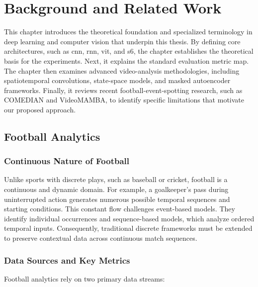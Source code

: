\chapter{Background and Related Work}
\label{chap:background}

This chapter introduces the theoretical foundation and specialized terminology in deep learning and computer vision that underpin this thesis. By defining core architectures, such as \acrfull{cnn}, \acrfull{rnn}, \acrfull{vit}, and \acrfull{s6}, the chapter establishes the theoretical basis for the experiments. Next, it explains the standard evaluation metric \acrfull{map}. The chapter then examines advanced video-analysis methodologies, including spatiotemporal convolutions, state-space models, and masked autoencoder frameworks. Finally, it reviews recent football-event-spotting research, such as COMEDIAN and VideoMAMBA, to identify specific limitations that motivate our proposed approach.

\section{Football Analytics}
\label{sec:football_analytics}

\subsection{Continuous Nature of Football}
Unlike sports with discrete plays, such as baseball or cricket, football is a continuous and dynamic domain. For example, a goalkeeper's pass during uninterrupted action generates numerous possible temporal sequences and starting conditions. This constant flow challenges event-based models. They identify individual occurrences and sequence-based models, which analyze ordered temporal inputs. Consequently, traditional discrete frameworks must be extended to preserve contextual data across continuous match sequences. 

\subsection{Data Sources and Key Metrics}
Football analytics rely on two primary data streams:

